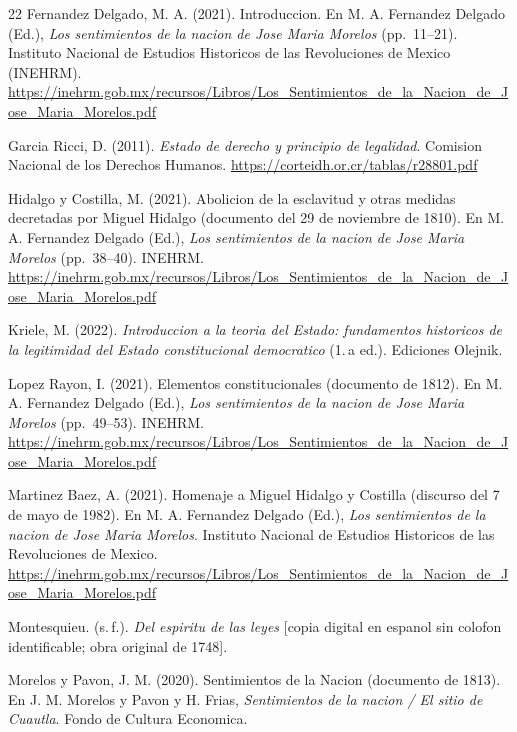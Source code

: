 \documentclass[spanish,letterpaper,oneside]{article}
\begin{document}
\begin{thebibliography}{22}
Fernandez Delgado, M. A. (2021). Introduccion. En M. A. Fernandez Delgado
(Ed.), \emph{Los sentimientos de la nacion de Jose Maria Morelos}
(pp.~11--21). Instituto Nacional de Estudios Historicos de las Revoluciones
de Mexico (INEHRM).
\url{https://inehrm.gob.mx/recursos/Libros/Los_Sentimientos_de_la_Nacion_de_Jose_Maria_Morelos.pdf}

Garcia Ricci, D. (2011). \emph{Estado de derecho y principio de legalidad}.
Comision Nacional de los Derechos Humanos.
\url{https://corteidh.or.cr/tablas/r28801.pdf}

Hidalgo y Costilla, M. (2021). Abolicion de la esclavitud y otras
medidas decretadas por Miguel Hidalgo (documento del 29 de noviembre
de 1810). En M. A. Fernandez Delgado (Ed.), \emph{Los sentimientos de
la nacion de Jose Maria Morelos} (pp.~38--40). INEHRM.
\url{https://inehrm.gob.mx/recursos/Libros/Los_Sentimientos_de_la_Nacion_de_Jose_Maria_Morelos.pdf}

Kriele, M. (2022). \emph{Introduccion a la teoria del Estado: fundamentos
historicos de la legitimidad del Estado constitucional democratico}
(1.\,a ed.). Ediciones Olejnik.

Lopez Rayon, I. (2021). Elementos constitucionales (documento de 1812).
En M. A. Fernandez Delgado (Ed.), \emph{Los sentimientos de la nacion
de Jose Maria Morelos} (pp.~49--53). INEHRM.
\url{https://inehrm.gob.mx/recursos/Libros/Los_Sentimientos_de_la_Nacion_de_Jose_Maria_Morelos.pdf}

Martinez Baez, A. (2021). Homenaje a Miguel Hidalgo y Costilla
(discurso del 7 de mayo de 1982). En M. A. Fernandez Delgado (Ed.),
\emph{Los sentimientos de la nacion de Jose Maria Morelos}.
Instituto Nacional de Estudios Historicos de las Revoluciones de Mexico.
\url{https://inehrm.gob.mx/recursos/Libros/Los_Sentimientos_de_la_Nacion_de_Jose_Maria_Morelos.pdf}

Montesquieu. (s.\,f.). \emph{Del espiritu de las leyes}
[copia digital en espanol sin colofon identificable; obra original de 1748].

Morelos y Pavon, J. M. (2020). Sentimientos de la Nacion
(documento de 1813). En J. M. Morelos y Pavon y H. Frias,
\emph{Sentimientos de la nacion / El sitio de Cuautla}.
Fondo de Cultura Economica.


\end{thebibliography}
\end{document}
